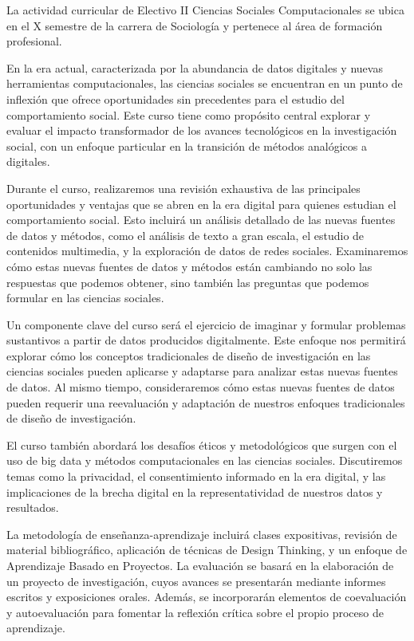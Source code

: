 \documentclass[11pt,letter,]{article}
\begin{document}
La actividad curricular de Electivo II Ciencias Sociales Computacionales
se ubica en el X semestre de la carrera de Sociología y pertenece al
área de formación profesional.

En la era actual, caracterizada por la abundancia de datos digitales y
nuevas herramientas computacionales, las ciencias sociales se encuentran
en un punto de inflexión que ofrece oportunidades sin precedentes para
el estudio del comportamiento social. Este curso tiene como propósito
central explorar y evaluar el impacto transformador de los avances
tecnológicos en la investigación social, con un enfoque particular en la
transición de métodos analógicos a digitales.

Durante el curso, realizaremos una revisión exhaustiva de las
principales oportunidades y ventajas que se abren en la era digital para
quienes estudian el comportamiento social. Esto incluirá un análisis
detallado de las nuevas fuentes de datos y métodos, como el análisis de
texto a gran escala, el estudio de contenidos multimedia, y la
exploración de datos de redes sociales. Examinaremos cómo estas nuevas
fuentes de datos y métodos están cambiando no solo las respuestas que
podemos obtener, sino también las preguntas que podemos formular en las
ciencias sociales.

Un componente clave del curso será el ejercicio de imaginar y formular
problemas sustantivos a partir de datos producidos digitalmente. Este
enfoque nos permitirá explorar cómo los conceptos tradicionales de
diseño de investigación en las ciencias sociales pueden aplicarse y
adaptarse para analizar estas nuevas fuentes de datos. Al mismo tiempo,
consideraremos cómo estas nuevas fuentes de datos pueden requerir una
reevaluación y adaptación de nuestros enfoques tradicionales de diseño
de investigación.

El curso también abordará los desafíos éticos y metodológicos que surgen
con el uso de big data y métodos computacionales en las ciencias
sociales. Discutiremos temas como la privacidad, el consentimiento
informado en la era digital, y las implicaciones de la brecha digital en
la representatividad de nuestros datos y resultados.

La metodología de enseñanza-aprendizaje incluirá clases expositivas,
revisión de material bibliográfico, aplicación de técnicas de Design
Thinking, y un enfoque de Aprendizaje Basado en Proyectos. La evaluación
se basará en la elaboración de un proyecto de investigación, cuyos
avances se presentarán mediante informes escritos y exposiciones orales.
Además, se incorporarán elementos de coevaluación y autoevaluación para
fomentar la reflexión crítica sobre el propio proceso de aprendizaje.
\end{document}
